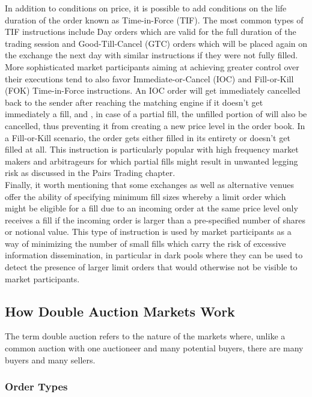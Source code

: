 In addition to conditions on price, it is possible to add conditions on the life duration of the order known as Time-in-Force (TIF). The most common types of TIF instructions include Day orders which are valid for the full duration of the trading session and Good-Till-Cancel (GTC) orders which will be placed again on the exchange the next day with similar instructions if they were not fully filled. More sophisticated market participants aiming at achieving greater control over their executions tend to also favor Immediate-or-Cancel (IOC) and Fill-or-Kill (FOK) Time-in-Force instructions. An IOC order will get immediately cancelled back to the sender after reaching the matching engine if it doesn't get immediately a fill, and , in case of a partial fill, the unfilled portion of will also be cancelled, thus preventing it from creating a new price level in the order book. In a Fill-or-Kill scenario, the order gets either filled in its entirety or doesn't get filled at all. This instruction is particularly popular with high frequency market makers and arbitrageurs for which partial fills might result in unwanted legging risk as discussed in the Pairs Trading chapter. \\

Finally, it worth mentioning that some exchanges as well as alternative venues offer the ability of specifying minimum fill sizes whereby a limit order which might be eligible for a fill due to an incoming order at the same price level only receives a fill if the incoming order is larger than a pre-specified number of shares or notional value. This type of instruction is used by market participants as a way of minimizing the number of small fills which carry the risk of excessive information dissemination, in particular in dark pools where they can be used to detect the presence of larger limit orders that would otherwise not be visible to market participants.  

\subsection{How Double Auction Markets Work}

The term double auction refers to the nature of the markets where, unlike a common auction with one auctioneer and many potential buyers, there are many buyers and many sellers.



\subsubsection{Order Types}
